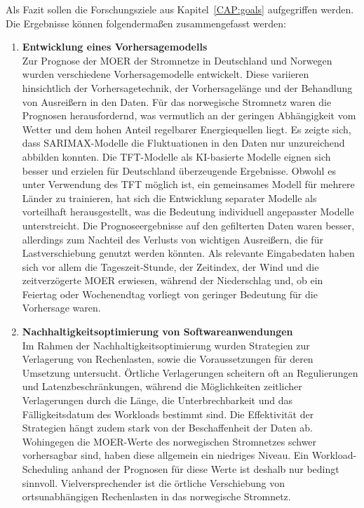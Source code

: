 Als Fazit sollen die Forschungsziele aus Kapitel~\ref{CAP:goals} aufgegriffen werden.
Die Ergebnisse können folgendermaßen zusammengefasst werden:
\begin{enumerate}
 \item \textbf{Entwicklung eines Vorhersagemodells} \\
 Zur Prognose der \ac{MOER} der Stromnetze in Deutschland und Norwegen wurden verschiedene Vorhersagemodelle entwickelt.
 Diese variieren hinsichtlich der Vorhersagetechnik, der Vorhersagelänge und der Behandlung von Ausreißern in den Daten.
 Für das norwegische Stromnetz waren die Prognosen herausfordernd, was vermutlich an der geringen Abhängigkeit vom Wetter und dem hohen Anteil regelbarer Energiequellen liegt.
 Es zeigte sich, dass \ac{SARIMAX}-Modelle die Fluktuationen in den Daten nur unzureichend abbilden konnten.
 Die \ac{TFT}-Modelle als \ac{KI}-basierte Modelle eignen sich besser und erzielen für Deutschland überzeugende Ergebnisse.
 Obwohl es unter Verwendung des \ac{TFT} möglich ist, ein gemeinsames Modell für mehrere Länder zu trainieren, hat sich die Entwicklung separater Modelle als vorteilhaft herausgestellt, was die Bedeutung individuell angepasster Modelle unterstreicht.
 Die Prognoseergebnisse auf den gefilterten Daten waren besser, allerdings zum Nachteil des Verlusts von wichtigen Ausreißern, die für Lastverschiebung genutzt werden könnten.
 Als relevante Eingabedaten haben sich vor allem die Tageszeit-Stunde, der Zeitindex, der Wind und die zeitverzögerte \ac{MOER} erwiesen, während der Niederschlag und, ob ein Feiertag oder Wochenendtag vorliegt von geringer Bedeutung für die Vorhersage waren.
 \item \textbf{Nachhaltigkeitsoptimierung von Softwareanwendungen} \\
 Im Rahmen der Nachhaltigkeitsoptimierung wurden Strategien zur Verlagerung von Rechenlasten, sowie die Voraussetzungen für deren Umsetzung untersucht.
 Örtliche Verlagerungen scheitern oft an Regulierungen und Latenzbeschränkungen, während die Möglichkeiten zeitlicher Verlagerungen durch die Länge, die Unterbrechbarkeit und das Fälligkeitsdatum des Workloads bestimmt sind.
 Die Effektivität der Strategien hängt zudem stark von der Beschaffenheit der Daten ab.
 Wohingegen die \ac{MOER}-Werte des norwegischen Stromnetzes schwer vorhersagbar sind, haben diese allgemein ein niedriges Niveau.
 Ein Workload-Scheduling anhand der Prognosen für diese Werte ist deshalb nur bedingt sinnvoll.
 Vielversprechender ist die örtliche Verschiebung von ortsunabhängigen Rechenlasten in das norwegische Stromnetz.

\end{enumerate}
